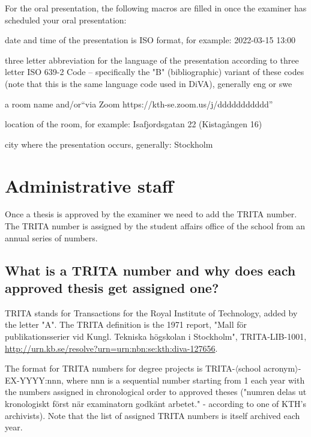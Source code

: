 For the oral presentation, the following macros are filled in once the examiner has scheduled your oral presentation:
\begin{description}[leftmargin=!, labelwidth =\widthof{\texttt{\textbackslash presentationDateAndTimeISO\{\}}}]
\item [\texttt{\textbackslash presentationDateAndTimeISO\{\}}] date and time of the presentation is ISO format, for example: 2022-03-15 13:00
\item [\texttt{\textbackslash presentationLanguage\{\}}] three letter abbreviation for the language of the presentation according to three letter ISO 639-2 Code – specifically the "B" (bibliographic) variant of these codes (note that this is the same language code used in DiVA), generally eng or swe
\item [\texttt{\textbackslash presentationRoom\{\}}] a room name and/or\hspace*{\fill}\linebreak[4] ``via Zoom https://kth-se.zoom.us/j/ddddddddddd''
\item [\texttt{\textbackslash presentationAddress\{\}}] location of the room, for example: Isafjordsgatan 22 (Kistagången 16)
\item [\texttt{\textbackslash presentationCity\{\}}] city where the presentation occurs, generally: Stockholm
\end{description}


\section{Administrative staff}
\label{sec:adminStaff}

Once a thesis is approved by the examiner we need to add the TRITA number. The TRITA number is assigned by the student affairs office of the school from an annual series of numbers.

\subsection{What is a TRITA number and why does each approved thesis get assigned one?}

TRITA stands for Transactions for the Royal Institute of Technology, added by the letter "A". The TRITA definition is the 1971 report, "Mall för publikationsserier vid Kungl. Tekniska högskolan i Stockholm", TRITA-LIB-1001, \url{http://urn.kb.se/resolve?urn=urn:nbn:se:kth:diva-127656}.

The format for TRITA numbers for degree projects is TRITA-$\langle$school acronym$\rangle$-EX-YYYY:nnn, where nnn is a sequential number starting from 1 each year with the numbers assigned in chronological order to approved theses ("numren delas ut kronologiskt först när examinatorn godkänt arbetet." - according to one of KTH's archivists). Note that the list of assigned TRITA numbers is itself archived each year.

